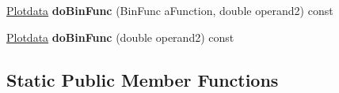 \begin{DoxyCompactItemize}
\item 
\hyperlink{class_plotdata}{Plotdata} {\bfseries do\+Bin\+Func} (Bin\+Func a\+Function, double operand2) const \hypertarget{class_plotdata_ab680cbaac4e9142e13c965b32f8a5889}{}\label{class_plotdata_ab680cbaac4e9142e13c965b32f8a5889}

\item 
\hyperlink{class_plotdata}{Plotdata} {\bfseries do\+Bin\+Func} (double operand2) const \hypertarget{class_plotdata_aa72d25d7774eea7460ae18c9e2a0a85c}{}\label{class_plotdata_aa72d25d7774eea7460ae18c9e2a0a85c}

\end{DoxyCompactItemize}
\subsection*{Static Public Member Functions}
